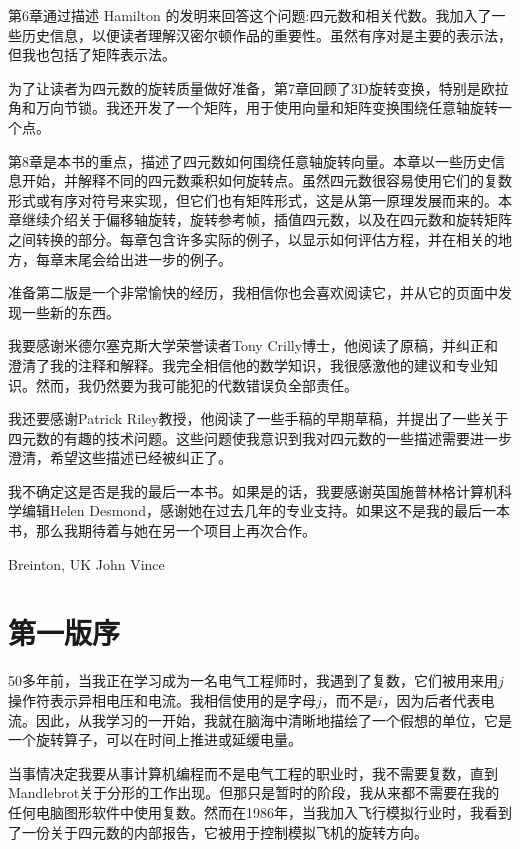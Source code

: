 第6章通过描述 Hamilton 的发明来回答这个问题:四元数和相关代数。我加入了一些历史信息，以便读者理解汉密尔顿作品的重要性。虽然有序对是主要的表示法，但我也包括了矩阵表示法。

为了让读者为四元数的旋转质量做好准备，第7章回顾了3D旋转变换，特别是欧拉角和万向节锁。我还开发了一个矩阵，用于使用向量和矩阵变换围绕任意轴旋转一个点。

第8章是本书的重点，描述了四元数如何围绕任意轴旋转向量。本章以一些历史信息开始，并解释不同的四元数乘积如何旋转点。虽然四元数很容易使用它们的复数形式或有序对符号来实现，但它们也有矩阵形式，这是从第一原理发展而来的。本章继续介绍关于偏移轴旋转，旋转参考帧，插值四元数，以及在四元数和旋转矩阵之间转换的部分。每章包含许多实际的例子，以显示如何评估方程，并在相关的地方，每章末尾会给出进一步的例子。

准备第二版是一个非常愉快的经历，我相信你也会喜欢阅读它，并从它的页面中发现一些新的东西。

我要感谢米德尔塞克斯大学荣誉读者Tony Crilly博士，他阅读了原稿，并纠正和澄清了我的注释和解释。我完全相信他的数学知识，我很感激他的建议和专业知识。然而，我仍然要为我可能犯的代数错误负全部责任。

我还要感谢Patrick Riley教授，他阅读了一些手稿的早期草稿，并提出了一些关于四元数的有趣的技术问题。这些问题使我意识到我对四元数的一些描述需要进一步澄清，希望这些描述已经被纠正了。

我不确定这是否是我的最后一本书。如果是的话，我要感谢英国施普林格计算机科学编辑Helen Desmond，感谢她在过去几年的专业支持。如果这不是我的最后一本书，那么我期待着与她在另一个项目上再次合作。



Breinton, UK \hfill John Vince


\newpage
{}
\section*{第一版序}


50多年前，当我正在学习成为一名电气工程师时，我遇到了复数，它们被用来用$j$操作符表示异相电压和电流。我相信使用的是字母$j$，而不是$ i $，因为后者代表电流。因此，从我学习的一开始，我就在脑海中清晰地描绘了一个假想的单位，它是一个旋转算子，可以在时间上推进或延缓电量。


当事情决定我要从事计算机编程而不是电气工程的职业时，我不需要复数，直到Mandlebrot关于分形的工作出现。但那只是暂时的阶段，我从来都不需要在我的任何电脑图形软件中使用复数。然而在1986年，当我加入飞行模拟行业时，我看到了一份关于四元数的内部报告，它被用于控制模拟飞机的旋转方向。

